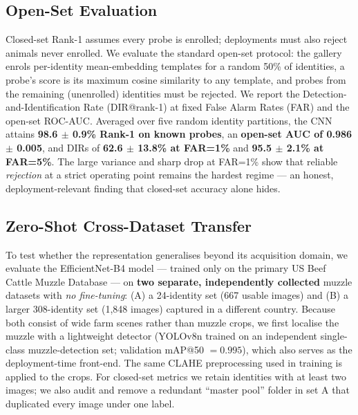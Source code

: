 \documentclass[11pt]{article}
\begin{document}
\subsection{Open-Set Evaluation}\label{sec:openset}
Closed-set Rank-1 assumes every probe is enrolled; deployments must also reject animals
never enrolled. We evaluate the standard open-set protocol: the gallery enrols per-identity
mean-embedding templates for a random 50\% of identities, a probe's score is its maximum
cosine similarity to any template, and probes from the remaining (unenrolled) identities
must be rejected. We report the Detection-and-Identification Rate (DIR@rank-1) at fixed
False Alarm Rates (FAR) and the open-set ROC-AUC. Averaged over five random identity
partitions, the CNN attains \textbf{98.6 $\pm$ 0.9\% Rank-1 on known probes}, an
\textbf{open-set AUC of 0.986 $\pm$ 0.005}, and DIRs of \textbf{62.6 $\pm$ 13.8\% at
FAR=1\%} and \textbf{95.5 $\pm$ 2.1\% at FAR=5\%}. The large variance and sharp drop at
FAR=1\% show that reliable \emph{rejection} at a strict operating point remains the hardest
regime --- an honest, deployment-relevant finding that closed-set accuracy alone hides.

\subsection{Zero-Shot Cross-Dataset Transfer}\label{sec:cross}
To test whether the representation generalises beyond its acquisition domain, we evaluate
the EfficientNet-B4 model --- trained only on the primary US Beef Cattle Muzzle Database ---
on \textbf{two separate, independently collected} muzzle datasets with \emph{no
fine-tuning}: (A) a 24-identity set (667 usable images) and (B) a larger 308-identity set
(1{,}848 images) captured in a different country. Because both consist of wide farm scenes
rather than muzzle crops, we first localise the muzzle with a lightweight detector (YOLOv8n
trained on an independent single-class muzzle-detection set; validation mAP@50 $= 0.995$),
which also serves as the deployment-time front-end. The same CLAHE preprocessing used in
training is applied to the crops. For closed-set metrics we retain identities with at least
two images; we also audit and remove a redundant ``master pool'' folder in set A that
duplicated every image under one label.
\end{document}

